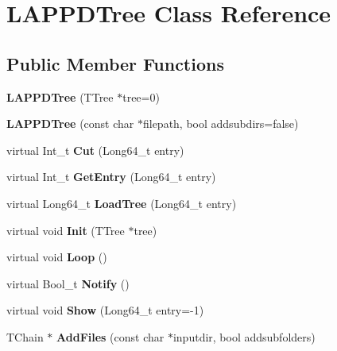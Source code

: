 \hypertarget{classLAPPDTree}{
\section{LAPPDTree Class Reference}
\label{classLAPPDTree}
}
\subsection*{Public Member Functions}
\begin{DoxyCompactItemize}
\item 
\hypertarget{classLAPPDTree_abb24c0d515c12bc1809d5d0bf7c6abc6}{
{\bfseries LAPPDTree} (TTree $\ast$tree=0)}
\label{classLAPPDTree_abb24c0d515c12bc1809d5d0bf7c6abc6}

\item 
\hypertarget{classLAPPDTree_a64600503669b4b3d36763db323ef56f3}{
{\bfseries LAPPDTree} (const char $\ast$filepath, bool addsubdirs=false)}
\label{classLAPPDTree_a64600503669b4b3d36763db323ef56f3}

\item 
\hypertarget{classLAPPDTree_a88072a0e2cc4fcceaa929968f3da46e3}{
virtual Int\_\-t {\bfseries Cut} (Long64\_\-t entry)}
\label{classLAPPDTree_a88072a0e2cc4fcceaa929968f3da46e3}

\item 
\hypertarget{classLAPPDTree_a1d8e6cc2426b400555882ee7851480c9}{
virtual Int\_\-t {\bfseries GetEntry} (Long64\_\-t entry)}
\label{classLAPPDTree_a1d8e6cc2426b400555882ee7851480c9}

\item 
\hypertarget{classLAPPDTree_a97dbcea6a6dae6197cdc672ce74867c0}{
virtual Long64\_\-t {\bfseries LoadTree} (Long64\_\-t entry)}
\label{classLAPPDTree_a97dbcea6a6dae6197cdc672ce74867c0}

\item 
\hypertarget{classLAPPDTree_a427214efe50a475c58e9287674be1f07}{
virtual void {\bfseries Init} (TTree $\ast$tree)}
\label{classLAPPDTree_a427214efe50a475c58e9287674be1f07}

\item 
\hypertarget{classLAPPDTree_ad16b2af53b7d2ab9a2f63514cd0de6b4}{
virtual void {\bfseries Loop} ()}
\label{classLAPPDTree_ad16b2af53b7d2ab9a2f63514cd0de6b4}

\item 
\hypertarget{classLAPPDTree_aa811db4c6d3e7c433eb38f2f4769d817}{
virtual Bool\_\-t {\bfseries Notify} ()}
\label{classLAPPDTree_aa811db4c6d3e7c433eb38f2f4769d817}

\item 
\hypertarget{classLAPPDTree_ac5221c09835edce1fa0ad0858c045e82}{
virtual void {\bfseries Show} (Long64\_\-t entry=-\/1)}
\label{classLAPPDTree_ac5221c09835edce1fa0ad0858c045e82}

\item 
\hypertarget{classLAPPDTree_a5e16fe0d23c4821887fd356eb48b95a5}{
TChain $\ast$ {\bfseries AddFiles} (const char $\ast$inputdir, bool addsubfolders)}
\label{classLAPPDTree_a5e16fe0d23c4821887fd356eb48b95a5}

\end{DoxyCompactItemize}
